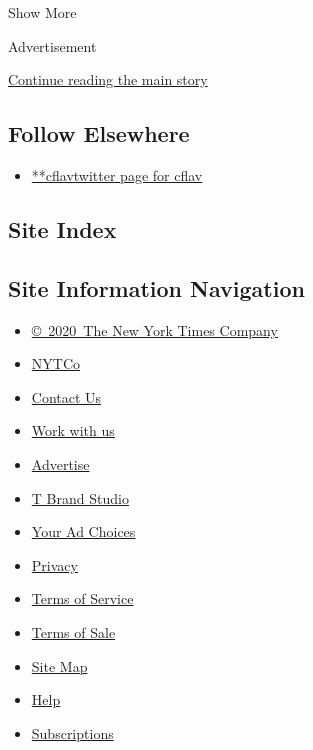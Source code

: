 Show More

Advertisement

\protect\hyperlink{after-mid2}{Continue reading the main story}

\hypertarget{follow-elsewhere}{%
\subsection{Follow Elsewhere}\label{follow-elsewhere}}

\begin{itemize}
\tightlist
\item
  \href{https://twitter.com/cflav}{**cflavtwitter page for cflav}
\end{itemize}

\hypertarget{site-index}{%
\subsection{Site Index}\label{site-index}}

\hypertarget{site-information-navigation}{%
\subsection{Site Information
Navigation}\label{site-information-navigation}}

\begin{itemize}
\tightlist
\item
  \href{https://help.nytimes3xbfgragh.onion/hc/en-us/articles/115014792127-Copyright-notice}{©~2020~The
  New York Times Company}
\end{itemize}

\begin{itemize}
\tightlist
\item
  \href{https://www.nytco.com/}{NYTCo}
\item
  \href{https://help.nytimes3xbfgragh.onion/hc/en-us/articles/115015385887-Contact-Us}{Contact
  Us}
\item
  \href{https://www.nytco.com/careers/}{Work with us}
\item
  \href{https://nytmediakit.com/}{Advertise}
\item
  \href{http://www.tbrandstudio.com/}{T Brand Studio}
\item
  \href{https://www.nytimes3xbfgragh.onion/privacy/cookie-policy\#how-do-i-manage-trackers}{Your
  Ad Choices}
\item
  \href{https://www.nytimes3xbfgragh.onion/privacy}{Privacy}
\item
  \href{https://help.nytimes3xbfgragh.onion/hc/en-us/articles/115014893428-Terms-of-service}{Terms
  of Service}
\item
  \href{https://help.nytimes3xbfgragh.onion/hc/en-us/articles/115014893968-Terms-of-sale}{Terms
  of Sale}
\item
  \href{https://spiderbites.nytimes3xbfgragh.onion}{Site Map}
\item
  \href{https://help.nytimes3xbfgragh.onion/hc/en-us}{Help}
\item
  \href{https://www.nytimes3xbfgragh.onion/subscription?campaignId=37WXW}{Subscriptions}
\end{itemize}
